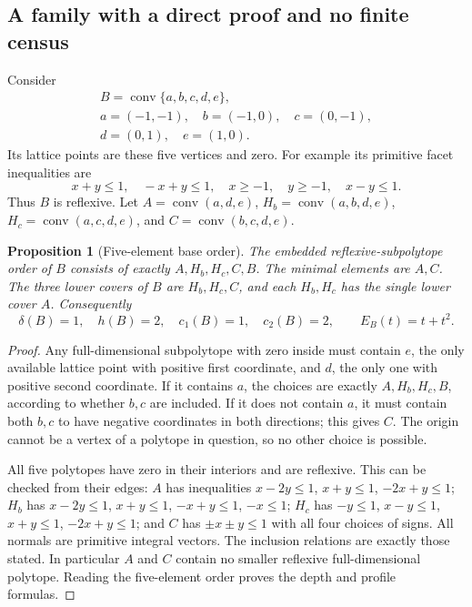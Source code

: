 \documentclass[manuscript]{aomart}
\newtheorem{proposition}[theorem]{Proposition}
\theoremstyle{definition}
\theoremstyle{remark}
\newcommand{\conv}{\operatorname{conv}}
\begin{document}
\subsection{A family with a direct proof and no finite census}
Consider
\[
\begin{gathered}
 B=\conv\{a,b,c,d,e\},\\
 a=(-1,-1),\quad b=(-1,0),\quad c=(0,-1),\\
 d=(0,1),\quad e=(1,0).
\end{gathered}
\]
Its lattice points are these five vertices and zero. For example its
primitive facet inequalities are
\[
 x+y\le1,\quad -x+y\le1,\quad x\ge-1,\quad y\ge-1,\quad x-y\le1.
\]
Thus $B$ is reflexive. Let $A=\conv(a,d,e)$,
$H_b=\conv(a,b,d,e)$, $H_c=\conv(a,c,d,e)$, and
$C=\conv(b,c,d,e)$.

\begin{proposition}[Five-element base order]\label{prop:fs-pentagon}
The embedded reflexive-subpolytope order of $B$ consists of exactly
$A,H_b,H_c,C,B$. The minimal elements are $A,C$. The three lower covers
of $B$ are $H_b,H_c,C$, and each $H_b,H_c$ has the single lower cover
$A$. Consequently
\[
 \delta(B)=1,\quad h(B)=2,\quad c_1(B)=1,\quad c_2(B)=2,
 \qquad E_B(t)=t+t^2.
\]
\end{proposition}
\begin{proof}
Any full-dimensional subpolytope with zero inside must contain $e$,
the only available lattice point with positive first coordinate, and
$d$, the only one with positive second coordinate. If it contains $a$,
the choices are exactly $A,H_b,H_c,B$, according to whether $b,c$ are
included. If it does not contain $a$, it must contain both $b,c$ to
have negative coordinates in both directions; this gives $C$.
The origin cannot be a vertex of a polytope in question, so no other
choice is possible.

All five polytopes have zero in their interiors and are reflexive.
This can be checked from their edges: $A$ has inequalities
$x-2y\le1$, $x+y\le1$, $-2x+y\le1$; $H_b$ has
$x-2y\le1$, $x+y\le1$, $-x+y\le1$, $-x\le1$;
$H_c$ has $-y\le1$, $x-y\le1$, $x+y\le1$, $-2x+y\le1$;
and $C$ has $\pm x\pm y\le1$ with all four choices of signs.
All normals are primitive integral vectors. The inclusion relations
are exactly those stated. In particular
$A$ and $C$ contain no smaller reflexive full-dimensional polytope.
Reading the five-element order proves the depth and profile formulas.
\end{proof}
\end{document}
